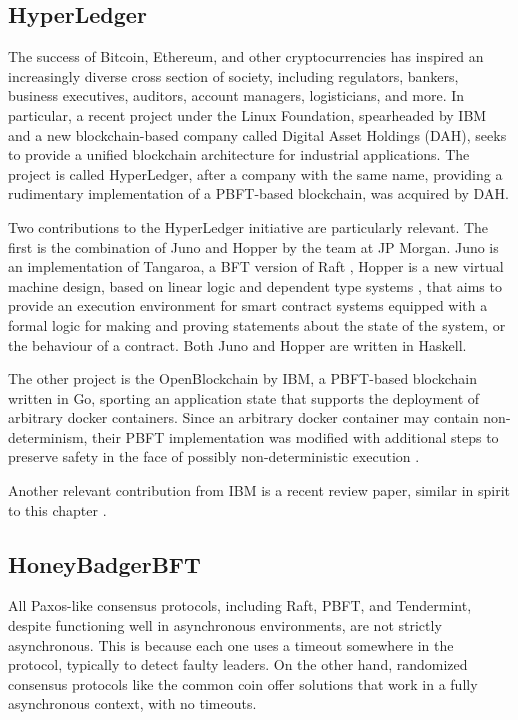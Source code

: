 \subsection{HyperLedger}

The success of Bitcoin, Ethereum, and other cryptocurrencies has inspired an increasingly diverse cross section of society,
including regulators, bankers, business executives, auditors, account managers, logisticians, and more.
In particular, a recent project under the Linux Foundation, spearheaded by IBM and a new blockchain-based company called Digital Asset Holdings (DAH), 
seeks to provide a unified blockchain architecture for industrial applications. The project is called HyperLedger,
after a company with the same name, providing a rudimentary implementation of a PBFT-based blockchain, was acquired by DAH.

Two contributions to the HyperLedger initiative are particularly relevant.
The first is the combination of Juno and Hopper by the team at JP Morgan.
Juno is an implementation of Tangaroa, a BFT version of Raft \cite{tangaroa},
Hopper is a new virtual machine design,
based on linear logic \cite{girard1987linear} and dependent type systems \cite{bove2009dependent},
that aims to provide an execution environment for smart contract systems equipped with a formal logic
for making and proving statements about the state of the system, or the behaviour of a contract.
Both Juno and Hopper are written in Haskell.

The other project is the OpenBlockchain by IBM, a PBFT-based blockchain written in Go,
sporting an application state that supports the deployment of arbitrary docker containers.
Since an arbitrary docker container may contain non-determinism, their PBFT implementation
was modified with additional steps to preserve safety in the face of possibly non-deterministic execution \cite{cachin2016non}.

Another relevant contribution from IBM is a recent review paper, similar in spirit to this chapter \cite{vukolic11quest}.

\subsection{HoneyBadgerBFT}

All Paxos-like consensus protocols, including Raft, PBFT, and Tendermint, 
despite functioning well in asynchronous environments, are not strictly asynchronous.
This is because each one uses a timeout somewhere in the protocol, typically to detect faulty leaders.
On the other hand, randomized consensus protocols like the common coin offer solutions that work in 
a fully asynchronous context, with no timeouts.

